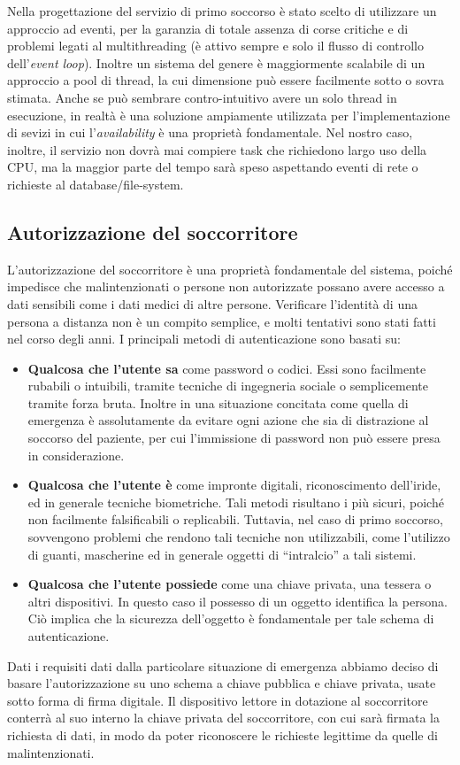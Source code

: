 \documentclass[a4paper,12pt]{report}
\begin{document}
Nella progettazione del servizio di primo soccorso è stato scelto di utilizzare un approccio ad eventi, per la garanzia di totale assenza di corse critiche e di problemi legati al multithreading (è attivo sempre e solo il flusso di controllo dell'\emph{event loop}). Inoltre un sistema del genere è maggiormente scalabile di un approccio a pool di thread, la cui dimensione può essere facilmente sotto o sovra stimata. Anche se può sembrare contro-intuitivo avere un solo thread in esecuzione, in realtà è una soluzione ampiamente utilizzata per l'implementazione di sevizi in cui l'\emph{availability} è una proprietà fondamentale. Nel nostro caso, inoltre, il servizio non dovrà mai compiere task che richiedono largo uso della CPU, ma la maggior parte del tempo sarà speso aspettando eventi di rete o richieste al database/file-system. 

\subsection{Autorizzazione del soccorritore}
L'autorizzazione del soccorritore è una proprietà fondamentale del sistema, poiché impedisce che malintenzionati o persone non autorizzate possano avere accesso a dati sensibili come i dati medici di altre persone. Verificare l'identità di una persona a distanza non è un compito semplice, e molti tentativi sono stati fatti nel corso degli anni. I principali metodi di autenticazione sono basati su: 
\begin{itemize}
	\item \textbf{Qualcosa che l'utente sa} come password o codici. Essi sono facilmente rubabili o intuibili, tramite tecniche di ingegneria sociale o semplicemente tramite forza bruta. Inoltre in una situazione concitata come quella di emergenza è assolutamente da evitare ogni azione che sia di distrazione al soccorso del paziente, per cui l'immissione di password non può essere presa in considerazione.
	\item \textbf{Qualcosa che l'utente è} come impronte digitali, riconoscimento dell'iride, ed in generale tecniche biometriche. Tali metodi risultano i più sicuri, poiché non facilmente falsificabili o replicabili. Tuttavia, nel caso di primo soccorso, sovvengono problemi che rendono tali tecniche non utilizzabili, come l'utilizzo di guanti, mascherine ed in generale oggetti di ``intralcio'' a tali sistemi. 
	\item \textbf{Qualcosa che l'utente possiede} come una chiave privata, una tessera o altri dispositivi. In questo caso il possesso di un oggetto identifica la persona. Ciò implica che la sicurezza dell'oggetto è fondamentale per tale schema di autenticazione. 
\end{itemize}
Dati i requisiti dati dalla particolare situazione di emergenza abbiamo deciso di basare l'autorizzazione su uno schema a chiave pubblica e chiave privata, usate sotto forma di firma digitale. Il dispositivo lettore in dotazione al soccorritore conterrà al suo interno la chiave privata del soccorritore, con cui sarà firmata la richiesta di dati, in modo da poter riconoscere le richieste legittime da quelle di malintenzionati. 
\end{document}
